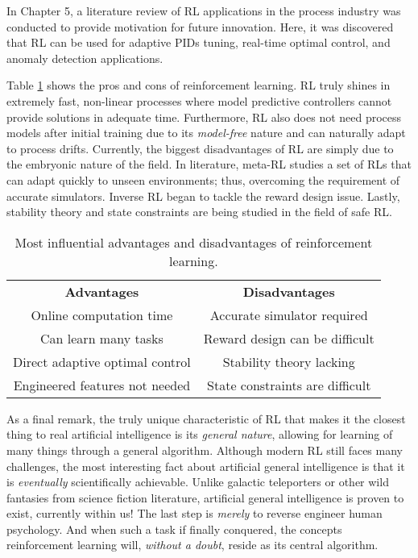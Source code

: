 In Chapter 5, a literature review of RL applications in the process industry was conducted to provide motivation for future innovation. Here, it was discovered that RL can be used for adaptive PIDs tuning, real-time optimal control, and anomaly detection applications.

Table \ref{tab:06adv_disadv} shows the pros and cons of reinforcement learning. RL truly shines in extremely fast, non-linear processes where model predictive controllers cannot provide solutions in adequate time.  Furthermore, RL also does not need process models after initial training due to its \textit{model-free} nature and can naturally adapt to process drifts. Currently, the biggest disadvantages of RL are simply due to the embryonic nature of the field. In literature, meta-RL studies a set of RLs that can adapt quickly to unseen environments; thus, overcoming the requirement of accurate simulators.  Inverse RL began to tackle the reward design issue. Lastly, stability theory and state constraints are being studied in the field of safe RL. 

\begin{table}[H]
\caption{Most influential advantages and disadvantages of reinforcement learning.}
\centering
\begin{tabular}{c|c}
\textbf{Advantages}	& \textbf{Disadvantages}\\
Online computation time  & Accurate simulator required			 \\
Can learn many tasks	   & Reward design can be difficult		 \\
Direct adaptive optimal control       & Stability theory lacking    \\
Engineered features not needed & State constraints are difficult \\
\end{tabular}
\label{tab:06adv_disadv}
\end{table}

As a final remark, the truly unique characteristic of RL that makes it the closest thing to real artificial intelligence is its \textit{general nature}, allowing for learning of many things through a general algorithm. Although modern RL still faces many challenges, the most interesting fact about artificial general intelligence is that it is \textit{eventually} scientifically achievable. Unlike galactic teleporters or other wild fantasies from science fiction literature, artificial general intelligence is proven to exist, currently within us!  The last step is \textit{merely} to reverse engineer human psychology. And when such a task if finally conquered, the concepts reinforcement learning will, \textit{without a doubt}, reside as its central algorithm.

